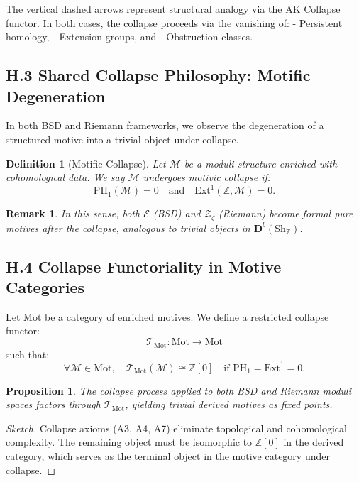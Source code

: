 \documentclass[11pt]{article}
\newtheorem{definition}[theorem]{Definition}
\newtheorem{proposition}[theorem]{Proposition}
\newtheorem{remark}[theorem]{Remark}
\begin{document}
The vertical dashed arrows represent structural analogy via the AK Collapse functor.  
In both cases, the collapse proceeds via the vanishing of:
- Persistent homology,
- Extension groups, and
- Obstruction classes.

\subsection*{H.3 Shared Collapse Philosophy: Motific Degeneration}

In both BSD and Riemann frameworks, we observe the degeneration of a structured motive into a trivial object under collapse.

\begin{definition}[Motific Collapse]
Let $\mathcal{M}$ be a moduli structure enriched with cohomological data.  
We say $\mathcal{M}$ undergoes motivic collapse if:
\[
\mathrm{PH}_1(\mathcal{M}) = 0 \quad \text{and} \quad \mathrm{Ext}^1(\mathbb{Z}, \mathcal{M}) = 0.
\]
\end{definition}

\begin{remark}
In this sense, both $\mathcal{E}$ (BSD) and $\mathcal{Z}_\zeta$ (Riemann) become formal pure motives  
after the collapse, analogous to trivial objects in $\mathbf{D}^b(\text{Sh}_\mathbb{Z})$.
\end{remark}

\subsection*{H.4 Collapse Functoriality in Motive Categories}

Let $\mathrm{Mot}$ be a category of enriched motives.  
We define a restricted collapse functor:
\[
\mathcal{T}_{\mathrm{Mot}} : \mathrm{Mot} \to \mathrm{Mot}
\]
such that:
\[
\forall \mathcal{M} \in \mathrm{Mot},\quad \mathcal{T}_{\mathrm{Mot}}(\mathcal{M}) \cong \mathbb{Z}[0] \quad \text{if } \mathrm{PH}_1 = \mathrm{Ext}^1 = 0.
\]

\begin{proposition}
The collapse process applied to both BSD and Riemann moduli spaces factors through $\mathcal{T}_{\mathrm{Mot}}$,  
yielding trivial derived motives as fixed points.
\end{proposition}

\begin{proof}[Sketch]
Collapse axioms (A3, A4, A7) eliminate topological and cohomological complexity.  
The remaining object must be isomorphic to $\mathbb{Z}[0]$ in the derived category,  
which serves as the terminal object in the motive category under collapse.
\end{proof}
\end{document}

